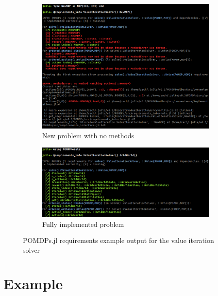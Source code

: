 \begin{figure}[htpb]
    \centering
    \begin{subfigure}[b]{0.48\textwidth}
    \begin{center}
        \includegraphics[width=\textwidth]{media/requirements_info_new.png}
    \end{center}
    \caption{New problem with no methods}
    \end{subfigure}
    \hfill
    \begin{subfigure}[b]{0.48\textwidth}
    \begin{center}
        \includegraphics[width=\textwidth]{media/requirements_info_gw.png}
    \end{center}
    \caption{Fully implemented problem}
    \end{subfigure}
     
    \caption[POMDPs.jl requirements example]{POMDPs.jl requirements example output for the value iteration solver}
    \label{fig:requirements}
\end{figure}

\section{Example}

